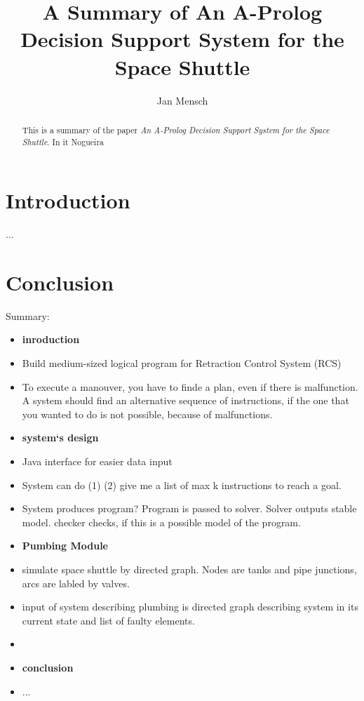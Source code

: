 \documentclass[runningheads]{llncs}
\newcommand{\papertitle}{An A-Prolog Decision Support System for the Space Shuttle}
\newcommand{\authorquote}{Nogueira \etal}
\begin{document}
\title{A Summary of \papertitle}

\author{Jan Mensch}




%
\maketitle              %
%
\begin{abstract}
This is a summary of the paper \textit{\papertitle}\cite{nogueira2001prolog}. In it \authorquote{}   


\end{abstract}

\section{Introduction} \label{sec:intro}

...



\section{Conclusion} \label{sec:conclusion}

Summary: 

\begin{itemize}
    \item \textbf{inroduction}
    \item Build medium-sized logical program for Retraction Control System (RCS)
    \item To execute a manouver, you have to finde a plan, even if there is malfunction. A system should find an alternative sequence of instructions, if the one that you wanted to do is not possible, because of malfunctions.
    \item \textbf{system`s design}
    \item Java interface for easier data input
    \item System can do (1)  (2) give me a list of max k instructions to reach a goal.
    \item System produces program? Program is passed to solver. Solver outputs stable model. checker checks, if this is a possible model of the program. 
    \item \textbf{Pumbing Module}
    \item simulate space shuttle by directed graph. Nodes are tanks and pipe junctions, arcs are labled by valves.
    \item input of system describing plumbing is directed graph describing system in its current state and list of faulty elements. 
    \item
    \item \textbf{conclusion}
    \item ...
\end{itemize}
\end{document}
